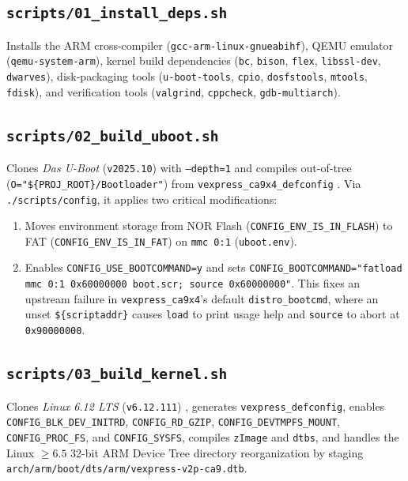 \documentclass[11pt,a4paper]{article}
\begin{document}
\subsection{\texttt{scripts/01\_install\_deps.sh}}
Installs the ARM cross-compiler (\texttt{gcc-arm-linux-gnueabihf}), QEMU emulator (\texttt{qemu-system-arm}), kernel build dependencies (\texttt{bc}, \texttt{bison}, \texttt{flex}, \texttt{libssl-dev}, \texttt{dwarves}), disk-packaging tools (\texttt{u-boot-tools}, \texttt{cpio}, \texttt{dosfstools}, \texttt{mtools}, \texttt{fdisk}), and verification tools (\texttt{valgrind}, \texttt{cppcheck}, \texttt{gdb-multiarch}).

\subsection{\texttt{scripts/02\_build\_uboot.sh}}
Clones \emph{Das U-Boot} (\texttt{v2025.10}) with \texttt{--depth=1} and compiles out-of-tree (\texttt{O="\$\{PROJ\_ROOT\}/Bootloader"}) from \texttt{vexpress\_ca9x4\_defconfig} \cite{uboot_release}. Via \texttt{./scripts/config}, it applies two critical modifications:
\begin{enumerate}
\item Moves environment storage from NOR Flash (\texttt{CONFIG\_ENV\_IS\_IN\_FLASH}) to FAT (\texttt{CONFIG\_ENV\_IS\_IN\_FAT}) on \texttt{mmc 0:1} (\texttt{uboot.env}).
\item Enables \texttt{CONFIG\_USE\_BOOTCOMMAND=y} and sets \texttt{CONFIG\_BOOTCOMMAND="fatload mmc 0:1 0x60000000 boot.scr; source 0x60000000"}. This fixes an upstream failure in \texttt{vexpress\_ca9x4}'s default \texttt{distro\_bootcmd}, where an unset \texttt{\$\{scriptaddr\}} causes \texttt{load} to print usage help and \texttt{source} to abort at \texttt{0x90000000}.
\end{enumerate}

\subsection{\texttt{scripts/03\_build\_kernel.sh}}
Clones \emph{Linux 6.12 LTS} (\texttt{v6.12.111}) \cite{kernel_releases}, generates \texttt{vexpress\_defconfig}, enables \texttt{CONFIG\_BLK\_DEV\_INITRD}, \texttt{CONFIG\_RD\_GZIP}, \texttt{CONFIG\_DEVTMPFS\_MOUNT}, \texttt{CONFIG\_PROC\_FS}, and \texttt{CONFIG\_SYSFS}, compiles \texttt{zImage} and \texttt{dtbs}, and handles the Linux $\ge 6.5$ 32-bit ARM Device Tree directory reorganization by staging \texttt{arch/arm/boot/dts/arm/vexpress-v2p-ca9.dtb}.
\end{document}
